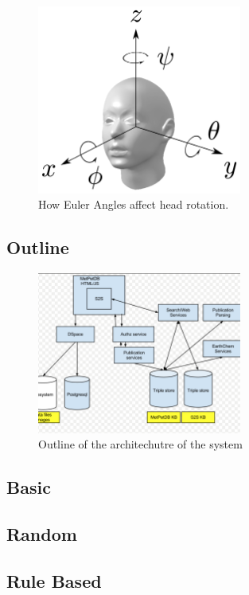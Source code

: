 \documentclass[bsc,frontabs,twoside,singlespacing,parskip]{infthesis}
\begin{document}
\begin{figure}
	\centering
	\includegraphics[width=0.6\textwidth]{head_with_euler.png}
	\caption{How Euler Angles affect head rotation.}
\end{figure}


\subsection{Outline}

\begin{figure}
	\centering
	\includegraphics[width=0.6\textwidth]{test.png}
	\caption{Outline of the architechutre of the system}
\end{figure}

\subsection{Basic}

\subsection{Random}

\subsection{Rule Based}
\end{document}
